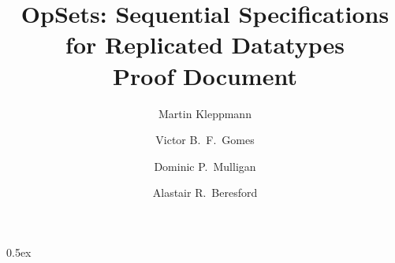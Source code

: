 \documentclass[11pt,a4paper]{article}
\begin{document}
\title{OpSets: Sequential Specifications for Replicated Datatypes\\Proof Document}
\author[1]{Martin Kleppmann}
\author[1]{Victor B.\ F.\ Gomes}
\author[2]{Dominic P.\ Mulligan}
\author[1]{Alastair R.\ Beresford}
\date{}
\maketitle

\tableofcontents

\parindent 0pt\parskip 0.5ex




{}
\end{document}
